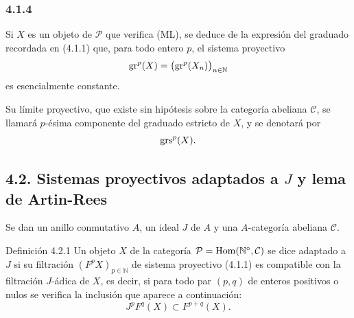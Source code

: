 \subsubsection*{4.1.4}
Si $X$ es un objeto de \(\mathcal P\) que verifica (ML), se deduce de la expresión del graduado recordada en (4.1.1) que, para todo entero \(p\), el sistema proyectivo
\[
\operatorname{gr}^p(X)=\bigl(\operatorname{gr}^p(X_n)\bigr)_{n\in\mathbb N}
\]
es esencialmente constante.

Su límite proyectivo, que existe sin hipótesis sobre la categoría abeliana \(\mathcal C\), se llamará \(p\)-ésima componente del graduado estricto de \(X\), y se denotará por
\[
\operatorname{grs}^p(X).
\]

\subsection*{4.2. Sistemas proyectivos adaptados a \(J\) y lema de Artin-Rees}

Se dan un anillo conmutativo \(A\), un ideal \(J\) de \(A\) y una \(A\)-categoría abeliana \(\mathcal C\).

\begin{statement}{Definición 4.2.1}
Un objeto \(X\) de la categoría \(\mathcal P=\operatorname{Hom}(\mathbb N^\circ,\mathcal C)\) se dice adaptado a \(J\) si su filtración \((F^pX)_{p\in\mathbb N}\) de sistema proyectivo (4.1.1) es compatible con la filtración \(J\)-ádica de \(X\), es decir, si para todo par \((p,q)\) de enteros positivos o nulos se verifica la inclusión que aparece a continuación:
\[
J^pF^q(X)\subset F^{p+q}(X).
\]
\end{statement}

